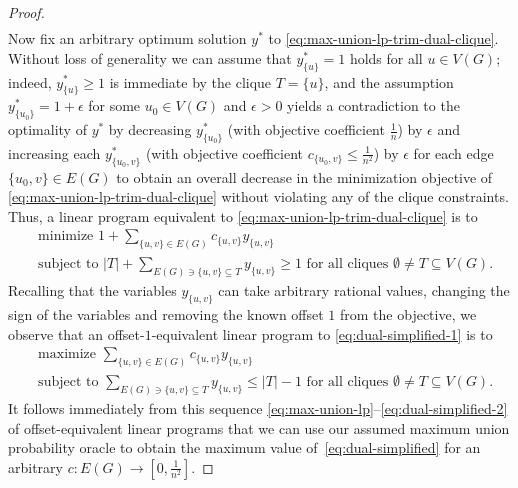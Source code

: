 \documentclass[10pt,a4paper]{amsart}
\begin{document}
\begin{proof}
\begin{equation}
\begin{split}
\end{split}
\end{equation}
Now fix an arbitrary optimum solution $y^*$ to \eqref{eq:max-union-lp-trim-dual-clique}. Without loss of generality we can assume that 
$y^*_{\{u\}}=1$ holds for all $u\in V(G)$; 
indeed, $y^*_{\{u\}}\geq 1$ is immediate by the clique $T=\{u\}$, and 
the assumption $y^*_{\{u_0\}}=1+\epsilon$ for some $u_0\in V(G)$
and $\epsilon>0$ yields a contradiction to the optimality of 
$y^*$ by decreasing $y^*_{\{u_0\}}$ (with objective coefficient $\frac{1}{n}$) 
by $\epsilon$ and increasing each $y^*_{\{u_0,v\}}$ 
(with objective coefficient $c_{\{u_0,v\}}\leq\frac{1}{n^2}$)
by $\epsilon$ for each edge $\{u_0,v\}\in E(G)$ 
to obtain an overall decrease in the minimization objective of 
\eqref{eq:max-union-lp-trim-dual-clique} without 
violating any of the clique constraints.
Thus, a linear program equivalent to \eqref{eq:max-union-lp-trim-dual-clique}
is to
\begin{equation}
\label{eq:dual-simplified-1}
\begin{split}
&\text{minimize $1+\sum_{\{u,v\}\in E(G)}c_{\{u,v\}}y_{\{u,v\}}$}\\
&\text{subject to $|T|+\sum_{E(G)\ni \{u,v\}\subseteq T}y_{\{u,v\}}\geq 1$ 
for all cliques $\emptyset\neq T\subseteq V(G)$}. 
\end{split}
\end{equation}
Recalling that the variables 
$y_{\{u,v\}}$ can take arbitrary rational values, changing the sign 
of the variables and removing the known offset $1$ from the objective, 
we observe that an offset-$1$-equivalent linear program 
to \eqref{eq:dual-simplified-1} is to 
\begin{equation}
\label{eq:dual-simplified-2}
\begin{split}
&\text{maximize $\sum_{\{u,v\}\in E(G)}c_{\{u,v\}}y_{\{u,v\}}$}\\
&\text{subject to $\sum_{E(G)\ni \{u,v\}\subseteq T}y_{\{u,v\}}\leq |T|-1$ 
for all cliques $\emptyset\neq T\subseteq V(G)$}.
\end{split}
\end{equation}
It follows immediately from this sequence \eqref{eq:max-union-lp}--\eqref{eq:dual-simplified-2} of offset-equivalent linear programs
that we can use our assumed maximum union probability oracle to obtain 
the maximum value of~\eqref{eq:dual-simplified} 
for an arbitrary $c:E(G)\rightarrow [0,\frac{1}{n^2}]$.


\end{proof}
\end{document}
